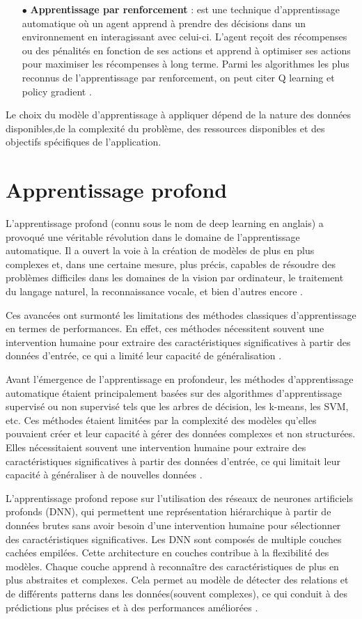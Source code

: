 \begin{enumerate}
\item [$\bullet$] \textbf{Apprentissage par renforcement} : est une technique d'apprentissage automatique où un agent apprend à prendre des décisions dans un environnement en interagissant avec celui-ci. L'agent reçoit des récompenses ou des pénalités en fonction de ses actions et apprend à optimiser ses actions pour maximiser les récompenses à long terme. Parmi les algorithmes les plus reconnus de l'apprentissage par renforcement, on peut citer Q learning \cite{q_learning_01} et policy gradient \cite{policy_gradient_01}.
\end{enumerate}
Le choix du modèle d'apprentissage à appliquer dépend de la nature des données disponibles,de la complexité du problème, des ressources disponibles et des objectifs spécifiques de l'application.
\section{Apprentissage profond}
L'apprentissage profond (connu sous le nom de deep learning en anglais) a provoqué une véritable révolution dans le domaine de l'apprentissage automatique. Il a ouvert la voie à la création de modèles de plus en plus complexes et, dans une certaine mesure, plus précis, capables de résoudre des problèmes difficiles dans les domaines de la vision par ordinateur, le traitement du langage naturel, la reconnaissance vocale, et bien d'autres encore \cite{ch_Deep_Learning}.

Ces avancées ont surmonté les limitations des méthodes classiques d'apprentissage en termes de performances. En effet, ces méthodes nécessitent souvent une intervention humaine pour extraire des caractéristiques significatives à partir des données d'entrée, ce qui a limité leur capacité de  généralisation \cite{ch_Deep_Learning}.

Avant l'émergence de l'apprentissage en profondeur, les méthodes d'apprentissage automatique étaient principalement basées sur des algorithmes d'apprentissage supervisé ou non supervisé tels que les arbres de décision, les k-means, les SVM, etc. Ces méthodes étaient limitées par la complexité des modèles qu'elles pouvaient créer et leur capacité à gérer des données complexes et non structurées. Elles nécessitaient souvent une intervention humaine pour extraire des caractéristiques significatives à partir des données d'entrée, ce qui limitait leur capacité à généraliser à de nouvelles données \cite{ch_Deep_Learning}.

L'apprentissage profond repose sur l'utilisation des réseaux de neurones artificiels profonds (DNN), qui permettent une représentation hiérarchique à partir de données brutes sans avoir besoin d'une intervention humaine pour sélectionner des caractéristiques significatives. 
Les DNN sont composés de  multiple couches cachées empilées. Cette architecture en couches contribue à la flexibilité des modèles. Chaque couche apprend à reconnaître des caractéristiques de plus en plus abstraites et complexes. Cela permet au modèle de détecter des relations et de différents patterns dans les données(souvent complexes), ce qui conduit à des prédictions plus précises et à des performances améliorées \cite{ch_Deep_Learning}.


